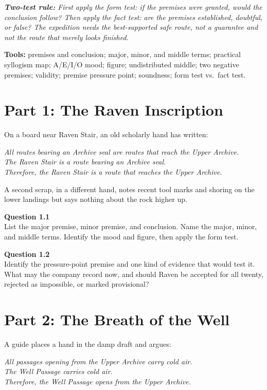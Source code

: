 \documentclass[12pt]{article}
\newcommand{\cluebox}[1]{\par\vspace{0.12em}\noindent\begin{minipage}{\textwidth}\itshape #1\end{minipage}\par\vspace{0.12em}}
\begin{document}
\cluebox{\textbf{Two-test rule:} First apply the \emph{form test}: if the premises were granted, would the conclusion follow? Then apply the \emph{fact test}: are the premises established, doubtful, or false? The expedition needs the \emph{best-supported safe route}, not a guarantee and not the route that merely looks finished.}

\textbf{Tools:} premises and conclusion; major, minor, and middle terms; practical syllogism map; A/E/I/O mood; figure; undistributed middle; two negative premises; validity; premise pressure point; soundness; form test vs.\ fact test.
\newpage
\section*{Part 1: The Raven Inscription}
On a board near Raven Stair, an old scholarly hand has written:

\cluebox{All routes bearing an Archive seal are routes that reach the Upper Archive.\\
The Raven Stair is a route bearing an Archive seal.\\
Therefore, the Raven Stair is a route that reaches the Upper Archive.}

A second scrap, in a different hand, notes recent tool marks and shoring on the lower landings but says nothing about the rock higher up.

\textbf{Question 1.1}\\[-0.15em]
List the major premise, minor premise, and conclusion. Name the major, minor, and middle terms. Identify the mood and figure, then apply the form test.

\textbf{Question 1.2}\\[-0.15em]
Identify the pressure-point premise and one kind of evidence that would test it. What may the company record now, and should Raven be accepted for all twenty, rejected as impossible, or marked provisional?

\newpage
\section*{Part 2: The Breath of the Well}
A guide places a hand in the damp draft and argues:

\cluebox{All passages opening from the Upper Archive carry cold air.\\
The Well Passage carries cold air.\\
Therefore, the Well Passage opens from the Upper Archive.}
\end{document}
